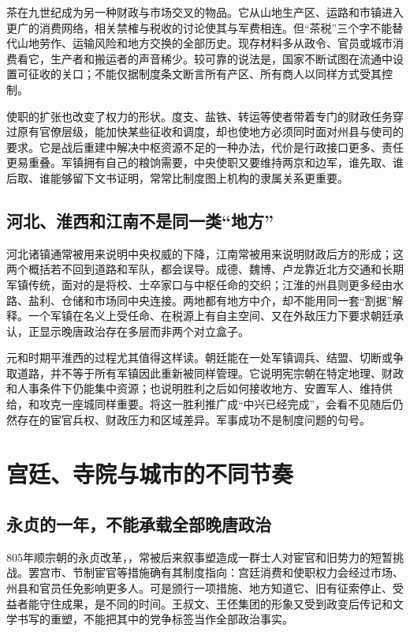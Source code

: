 茶在九世纪成为另一种财政与市场交叉的物品。它从山地生产区、运路和市镇进入更广的消费网络，相关禁榷与税收的讨论使其与军费相连。但“茶税”三个字不能替代山地劳作、运输风险和地方交换的全部历史。现存材料多从政令、官员或城市消费看它，生产者和搬运者的声音稀少。较可靠的说法是，国家不断试图在流通中设置可征收的关口；不能仅据制度条文断言所有产区、所有商人以同样方式受其控制。

使职的扩张也改变了权力的形状。度支、盐铁、转运等使者带着专门的财政任务穿过原有官僚层级，能加快某些征收和调度，却也使地方必须同时面对州县与使司的要求。它是战后重建中解决中枢资源不足的一种办法，代价是行政接口更多、责任更易重叠。军镇拥有自己的粮饷需要，中央使职又要维持两京和边军，谁先取、谁后取、谁能够留下文书证明，常常比制度图上机构的隶属关系更重要。

\subsection{河北、淮西和江南不是同一类“地方”}
河北诸镇通常被用来说明中央权威的下降，江南常被用来说明财政后方的形成；这两个概括若不回到道路和军队，都会误导。成德、魏博、卢龙靠近北方交通和长期军镇传统，面对的是将校、士卒家口与中枢任命的交织；江淮的州县则更多经由水路、盐利、仓储和市场同中央连接。两地都有地方中介，却不能用同一套“割据”解释。一个军镇在名义上受任命、在税源上有自主空间、又在外敌压力下要求朝廷承认，正显示晚唐政治存在多层而非两个对立盒子。

元和时期平淮西的过程尤其值得这样读。朝廷能在一处军镇调兵、结盟、切断或争取道路，并不等于所有军镇因此重新被同样管理。它说明宪宗朝在特定地理、财政和人事条件下仍能集中资源；也说明胜利之后如何接收地方、安置军人、维持供给，和攻克一座城同样重要。将这一胜利推广成“中兴已经完成”，会看不见随后仍然存在的宦官兵权、财政压力和区域差异。军事成功不是制度问题的句号。

\section{宫廷、寺院与城市的不同节奏}

\subsection{永贞的一年，不能承载全部晚唐政治}
805年顺宗朝的永贞改革，，常被后来叙事塑造成一群士人对宦官和旧势力的短暂挑战。罢宫市、节制宦官等措施确有其制度指向：宫廷消费和使职权力会经过市场、州县和官员任免影响更多人。可是颁行一项措施、地方知道它、旧有征索停止、受益者能守住成果，是不同的时间。王叔文、王伾集团的形象又受到政变后传记和文学书写的重塑，不能把其中的党争标签当作全部政治事实。

